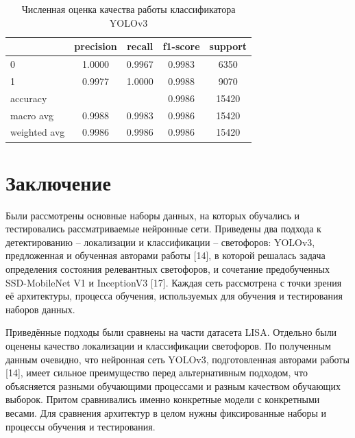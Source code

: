 \documentclass{misisarticle}
\begin{document}
\begin{table}[htbp]
  \caption{Численная оценка качества работы классификатора YOLOv3}
  \label{tab:yolo-cls}
  \centering
  \begin{tabular}{@{}lcccc@{}}
    \toprule
     & precision & recall & f1-score & support \\
    \midrule
    0 & 1.0000 & 0.9967 & 0.9983 & 6350 \\
    1 & 0.9977 & 1.0000 & 0.9988 & 9070 \\
    accuracy &  &  & 0.9986 & 15420 \\
    macro avg & 0.9988 & 0.9983 & 0.9986 & 15420 \\
    weighted avg & 0.9986 & 0.9986 & 0.9986 & 15420 \\
    \bottomrule
  \end{tabular}
\end{table}

\section{Заключение}

Были рассмотрены основные наборы данных, на которых обучались и тестировались рассматриваемые нейронные сети. Приведены два подхода к детектированию – локализации и классификации – светофоров: YOLOv3, предложенная и обученная авторами работы [14], в которой решалась задача определения состояния релевантных светофоров, и сочетание предобученных SSD-MobileNet V1 и InceptionV3 [17]. Каждая сеть рассмотрена с точки зрения её архитектуры, процесса обучения, используемых для обучения и тестирования наборов данных.

Приведённые подходы были сравнены на части датасета LISA. Отдельно были оценены качество локализации и классификации светофоров. По полученным данным очевидно, что нейронная сеть YOLOv3, подготовленная авторами работы [14], имеет сильное преимущество перед альтернативным подходом, что объясняется разными обучающими процессами и разным качеством обучающих выборок. Притом сравнивались именно конкретные модели с конкретными весами. Для сравнения архитектур в целом нужны фиксированные наборы и процессы обучения и тестирования.
\end{document}
